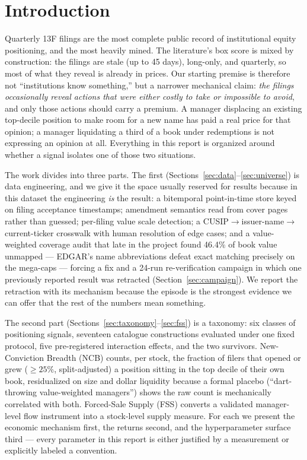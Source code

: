 \section{Introduction}
\label{sec:intro}

Quarterly 13F filings are the most complete public record of
institutional equity positioning, and the most heavily mined. The
literature's box score is mixed by construction: the filings are
stale (up to 45 days), long-only, and quarterly, so most of what they
reveal is already in prices. Our starting premise is therefore not
``institutions know something,'' but a narrower mechanical claim:
\emph{the filings occasionally reveal actions that were either costly
to take or impossible to avoid}, and only those actions should carry
a premium. A manager displacing an existing top-decile position to
make room for a new name has paid a real price for that opinion; a
manager liquidating a third of a book under redemptions is not
expressing an opinion at all. Everything in this report is organized
around whether a signal isolates one of those two situations.

The work divides into three parts. The first
(Sections~\ref{sec:data}--\ref{sec:universe}) is data engineering,
and we give it the space usually reserved for results because in this
dataset the engineering \emph{is} the result: a bitemporal
point-in-time store keyed on filing acceptance timestamps; amendment
semantics read from cover pages rather than guessed; per-filing value
scale detection; a CUSIP$\to$issuer-name$\to$current-ticker crosswalk
with human resolution of edge cases; and a value-weighted coverage
audit that late in the project found 46.4\% of book value unmapped
--- EDGAR's name abbreviations defeat exact matching precisely on the
mega-caps --- forcing a fix and a 24-run re-verification campaign in
which one previously reported result was retracted
(Section~\ref{sec:campaign}). We report the retraction with its
mechanism because the episode is the strongest evidence we can offer
that the rest of the numbers mean something.

The second part (Sections~\ref{sec:taxonomy}--\ref{sec:fss}) is a
taxonomy: six classes of positioning signals, seventeen catalogue
constructions evaluated under one fixed protocol, five pre-registered
interaction effects, and the two survivors. New-Conviction Breadth
(NCB) counts, per stock, the fraction of filers that opened or grew
($\ge 25\%$, split-adjusted) a position sitting in the top decile of
their own book, residualized on size and dollar liquidity because a
formal placebo (``dart-throwing value-weighted managers'') shows the
raw count is mechanically correlated with both. Forced-Sale Supply
(FSS) converts a validated manager-level flow instrument into a
stock-level supply measure. For each we present the economic
mechanism first, the returns second, and the hyperparameter surface
third --- every parameter in this report is either justified by a
measurement or explicitly labeled a convention.

